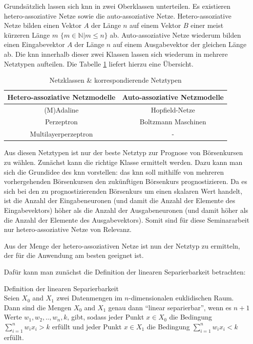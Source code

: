 Grundsätzlich lassen sich \acs{knn} in zwei Oberklassen unterteilen. Es existieren hetero-assoziative Netze sowie die auto-assoziative Netze. Hetero-assoziative Netze bilden einen Vektor $A$ der Länge $n$ auf einem Vektor $B$ einer meist kürzeren Länge $m$ $\{m \in \mathbb{N} | m \le n\}$ ab. Auto-assoziative Netze wiederum bilden einen Eingabevektor $A$ der Länge $n$ auf einem Ausgabevektor der gleichen Länge ab. Die \acs{knn} innerhalb dieser zwei Klassen lassen sich wiederum in mehrere Netztypen aufteilen. Die Tabelle \ref{tab:Netztypen} liefert hierzu eine Übersicht.

\begin{table}[H]
\centering
\begin{tabular}{|c|c|}
\hline 
\textbf{Hetero-assoziative Netzmodelle} & \textbf{Auto-assoziative Netzmodelle} \\ 
\hline 
(M)Adaline & Hopfield-Netze \\ 
\hline  
Perzeptron &  Boltzmann Maschinen \\ 
\hline 
Multilayerperzeptron & - \\ 
\hline 
\end{tabular} 
\label{tab:Netztypen}
\caption{Netzklassen \& korrespondierende Netztypen}

\end{table}


Aus diesen Netztypen ist nur der beste Netztyp zur Prognose von Börsenkursen zu wählen. Zunächst kann die richtige Klasse ermittelt werden. Dazu kann man sich die Grundidee des \acs{knn} vorstellen: das \acs{knn} soll mithilfe von mehreren vorhergehenden Börsenkursen den zukünftigen Börsenkurs prognostizieren. Da es sich bei den zu prognostizierenden Börsenkurs um einen skalaren Wert handelt, ist die Anzahl der Eingabeneuronen (und damit die Anzahl der Elemente des Eingabevektors) höher als die Anzahl der Ausgabeneuronen (und damit höher als die Anzahl der Elemente des Ausgabevektors). Somit sind für diese Seminararbeit nur hetero-assoziative Netze von Relevanz.

Aus der Menge der hetero-assoziativen Netze ist nun der Netztyp zu ermitteln, der für die Anwendung am besten geeignet ist.

Dafür kann man zunächst die Definition der linearen Separierbarkeit betrachten:

\begin{defi}Definition der linearen Separierbarkeit\\
Seien $X_{0}$ and $X_{1}$ zwei Datenmengen im $n$-dimensionalen euklidischen Raum. Dann sind die Mengen $X_{0}$ and $X_{1}$ genau dann  "`linear separierbar"', wenn es  $n+1$ Werte $w_{1}, w_{2},..,w_{n}, k$, gibt, sodass jeder Punkt  $x \in X_{0}$ die Bedingung $\sum^{n}_{i=1} w_{i}x_{i} > k$ erfüllt und jeder Punkt $x \in X_{1}$ die Bedingung $\sum^{n}_{i=1} w_{i}x_{i} < k$ erfüllt.
\end{defi}

